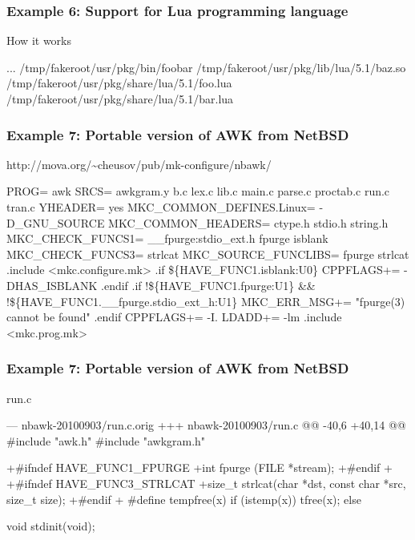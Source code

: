 \documentclass[hyperref={colorlinks=true}]{beamer}
\begin{document}
\begin{frame}[fragile]
  \frametitle{Example 6: Support for Lua programming language}

  \begin{block}{How it works}
  \begin{CodeNoLabel}
    ...
/tmp/fakeroot/usr/pkg/bin/foobar
/tmp/fakeroot/usr/pkg/lib/lua/5.1/baz.so
/tmp/fakeroot/usr/pkg/share/lua/5.1/foo.lua
/tmp/fakeroot/usr/pkg/share/lua/5.1/bar.lua
\prompt{\$}
  \end{CodeNoLabel}
  \end{block}
\end{frame}

\begin{frame}[fragile]
  \frametitle{Example 7: Portable version of AWK from NetBSD}

\begin{block}{http://mova.org/\~{}cheusov/pub/mk-configure/nbawk/}
\begin{CodeNoLabelSmallest}
PROG=	awk
SRCS=	awkgram.y b.c lex.c lib.c main.c parse.c
        proctab.c run.c tran.c
YHEADER=	yes
MKC\_COMMON\_DEFINES.Linux=	-D\_GNU\_SOURCE
MKC\_COMMON\_HEADERS=		ctype.h stdio.h string.h
MKC\_CHECK\_FUNCS1=		\_\_fpurge:stdio\_ext.h fpurge isblank
MKC\_CHECK\_FUNCS3=		strlcat
MKC\_SOURCE\_FUNCLIBS=		fpurge strlcat
.include <mkc.configure.mk>
.if \$\{HAVE\_FUNC1.isblank:U0\}
CPPFLAGS+=	-DHAS\_ISBLANK
.endif
.if !\$\{HAVE\_FUNC1.fpurge:U1\} && !\$\{HAVE_FUNC1.\_\_fpurge.stdio\_ext\_h:U1\}
MKC\_ERR\_MSG+=	"fpurge(3) cannot be found"
.endif
CPPFLAGS+=	-I.
LDADD+=		-lm
.include <mkc.prog.mk>
\end{CodeNoLabelSmallest}
\end{block}
\end{frame}

\begin{frame}[fragile]
  \frametitle{Example 7: Portable version of AWK from NetBSD}

\begin{block}{run.c}
\begin{CodeNoLabelSmallest}
--- nbawk-20100903/run.c.orig
+++ nbawk-20100903/run.c
@@ -40,6 +40,14 @@
 #include "awk.h"
 #include "awkgram.h"
 
+#ifndef HAVE_FUNC1_FPURGE
+int fpurge (FILE *stream);
+#endif
+
+#ifndef HAVE\_FUNC3\_STRLCAT
+size\_t strlcat(char *dst, const char *src, size_t size);
+#endif
+
 #define tempfree(x)    if (istemp(x)) tfree(x); else
 
 void stdinit(void);
\end{CodeNoLabelSmallest}
\end{block}
\end{frame}
\end{document}

